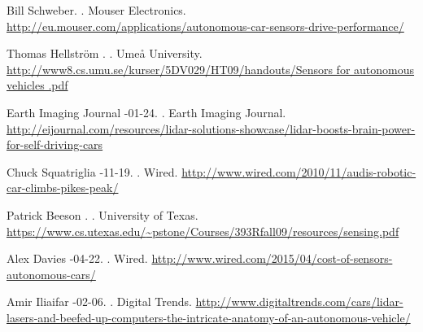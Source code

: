 \documentclass[11pt]{article}
\begin{document}
\begin{thebibliography}{}
Bill Schweber.
.
\newblock Mouser Electronics.
\newblock \href{http://eu.mouser.com/applications/autonomous-car-sensors-drive-performance/}{http://eu.mouser.com/applications/autonomous-car-sensors-drive-performance/}

Thomas Hellstr\"{o}m
.
.
\newblock Ume{\aa} University.
\newblock
\href{http://www8.cs.umu.se/kurser/5DV029/HT09/handouts/Sensors for autonomous vehicles .pdf}{http://www8.cs.umu.se/kurser/5DV029/HT09/handouts/Sensors for autonomous vehicles .pdf}

Earth Imaging Journal
-01-24.
.
\newblock Earth Imaging Journal.
\newblock
\href{http://eijournal.com/resources/lidar-solutions-showcase/lidar-boosts-brain-power-for-self-driving-cars}{http://eijournal.com/resources/lidar-solutions-showcase/lidar-boosts-brain-power-for-self-driving-cars}


Chuck Squatriglia
-11-19.
.
\newblock Wired.
\newblock
\href{http://www.wired.com/2010/11/audis-robotic-car-climbs-pikes-peak/}{http://www.wired.com/2010/11/audis-robotic-car-climbs-pikes-peak/}

Patrick Beeson
.
.
\newblock University of Texas.
\newblock
\href{https://www.cs.utexas.edu/~pstone/Courses/393Rfall09/resources/sensing.pdf}{https://www.cs.utexas.edu/{\textasciitilde}pstone/Courses/393Rfall09/resources/sensing.pdf}

Alex Davies
-04-22.
.
\newblock Wired.
\newblock
\href{http://www.wired.com/2015/04/cost-of-sensors-autonomous-cars/}{http://www.wired.com/2015/04/cost-of-sensors-autonomous-cars/}

Amir Iliaifar
-02-06.
.
\newblock Digital Trends.
\newblock
\href{http://www.digitaltrends.com/cars/lidar-lasers-and-beefed-up-computers-the-intricate-anatomy-of-an-autonomous-vehicle/}{http://www.digitaltrends.com/cars/lidar-lasers-and-beefed-up-computers-the-intricate-anatomy-of-an-autonomous-vehicle/}


\end{thebibliography}
\end{document}
